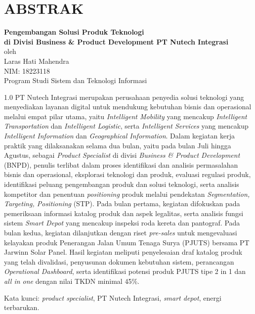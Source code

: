 \chapter*{ABSTRAK}

\begin{center}

    \textbf{Pengembangan Solusi Produk Teknologi \\di Divisi Business \& Product Development PT Nutech Integrasi} \\
    \vspace{0.4cm}
    oleh \\
    \vspace{0.4cm}
    Laras Hati Mahendra\\
    NIM: 18223118\\
    Program Studi Sistem dan Teknologi Informasi\\
\end{center}


\begin{spacing}{1.0}
PT Nutech Integrasi merupakan perusahaan penyedia solusi teknologi yang menyediakan layanan digital untuk mendukung kebutuhan bisnis dan operasional melalui empat pilar utama, yaitu \textit{Intelligent Mobility} yang mencakup \textit{Intelligent Transportation} dan \textit{Intelligent Logistic}, serta \textit{Intelligent Services} yang mencakup \textit{Intelligent Information} dan \textit{Geographical Information}. Dalam kegiatan kerja praktik yang dilaksanakan selama dua bulan, yaitu pada bulan Juli hingga Agustus, sebagai \textit{Product Specialist} di divisi \textit{Business \& Product Development} (BNPD), penulis terlibat dalam proses identifikasi dan analisis permasalahan bisnis dan operasional, eksplorasi teknologi dan produk, evaluasi regulasi produk, identifikasi peluang pengembangan produk dan solusi teknologi, serta analisis kompetitor dan penentuan \textit{positioning} produk melalui pendekatan \textit{Segmentation, Targeting, Positioning} (STP). Pada bulan pertama, kegiatan difokuskan pada pemeriksaan informasi katalog produk dan aspek legalitas, serta analisis fungsi sistem \textit{Smart Depot} yang mencakup inspeksi roda kereta dan pantograf. Pada bulan kedua, kegiatan dilanjutkan dengan riset \textit{pre-sales} untuk mengevaluasi kelayakan produk Penerangan Jalan Umum Tenaga Surya (PJUTS) bersama PT Jarwinn Solar Panel. Hasil kegiatan meliputi penyelesaian draf katalog produk yang telah divalidasi, penyusunan dokumen kebutuhan sistem, perancangan \textit{Operational Dashboard}, serta identifikasi potensi produk PJUTS tipe 2 in 1 dan \textit{all in one} dengan nilai TKDN minimal 45\%.

Kata kunci: \textit{product specialist}, PT Nutech Integrasi, \textit{smart depot}, energi terbarukan.

\end{spacing}
